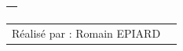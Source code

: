 \begin{titlepage}
\begin{center}
\begin{large}
\begin{bfseries}
\begin{tabular}{|p{10cm}|}
\begin{center}
							\end{center} \\

							\hline

						\end{tabular}




						\bigskip

						\bigskip

						\bigskip

						\bigskip

						\bigskip

						\bigskip

						\bigskip
						
						\bigskip
						
						\bigskip

						\begin{tabular}{l l}

							Réalisé par : Romain EPIARD \\

						\end{tabular}
						\bigskip
						\bigskip

					\end{bfseries}

				\end{large}

			\end{center}



		\end{titlepage}